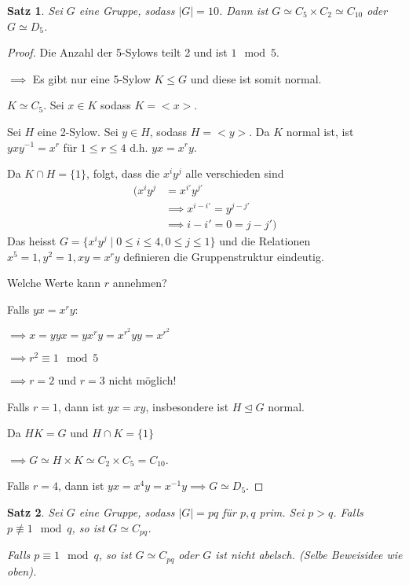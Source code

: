 \documentclass{article}
\theoremstyle{plain}
\newtheorem{theorem}{Satz}
\newcommand{\ug}{\leq}
\newcommand{\normal}{\trianglelefteq}
\newcommand{\zykl}[1]{{<}{#1}{>}}
\newcommand{\iso}{\simeq}
\begin{document}
\begin{theorem}
    Sei $G$ eine Gruppe, sodass $|G|=10$. Dann ist $G\iso C_5\times C_2\iso C_10$ oder $G\iso D_5$.
\end{theorem}
\begin{proof}
    Die Anzahl der 5-Sylows teilt 2 und ist $1 \mod 5$.

    $\implies$ Es gibt nur eine 5-Sylow $K\ug G$ und diese ist somit normal.

    $K\iso C_5$. Sei $x\in K$ sodass $K=\zykl{x}$.

    Sei $H$ eine 2-Sylow. Sei $y\in H$, sodass $H=\zykl{y}$. 
    Da $K$ normal ist, ist $yxy^{-1} = x^r$ für $1\leq r\leq 4$ d.h. $yx=x^ry$.

    Da $K\cap H=\{1\}$, folgt, dass die $x^iy^j$ alle verschieden sind 
    \begin{align*}
        (x^iy^j&=x^{i'}y^{j'}\\\
        &\implies x^{i-i'}=y^{j-j'}\\
        &\implies i-i'=0=j-j')
    \end{align*}
    Das heisst $G=\{x^iy^j\mid 0\leq i\leq 4, 0\leq j\leq 1\}$ und die Relationen $x^5=1, y^2=1, xy=x^ry$ definieren die Gruppenstruktur eindeutig.

    Welche Werte kann $r$ annehmen?
    
    Falls $yx=x^ry$:
    
    $\implies x=yyx=yx^ry=x^{r^2}yy=x^{r^2}$

    $\implies r^2\equiv 1\mod 5$

    $\implies r=2$ und $r=3$ nicht möglich!

    Falls $r=1$, dann ist $yx=xy$, insbesondere ist $H\normal G$ normal. 
    
    Da $HK=G$ und $H\cap K=\{1\}$

    $\implies G\iso H\times K\iso C_2\times C_5=C_10$.

    Falls $r=4$, dann ist $yx=x^4y=x^{-1}y \implies G\iso D_5$.
\end{proof}

\begin{theorem}
    Sei $G$ eine Gruppe, sodass $|G|=pq$ für $p,q$ prim. Sei $p>q$.
    Falls $p\not\equiv 1\mod q$, so ist $G\iso C_{pq}$.

    Falls $p\equiv 1\mod q$, so ist $G\iso C_{pq}$ oder $G$ ist nicht abelsch. (Selbe Beweisidee wie oben).
\end{theorem}
\end{document}
